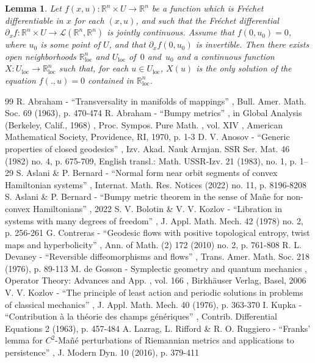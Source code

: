 \documentclass[11pt]{article}
\newcommand{\loc}{\mathrm{loc}}
\newcommand{\Rm}{\mathbb{R}}
\newcommand{\mL}{\ensuremath{\mathcal{L}}}
\theoremstyle{plain}
\newtheorem{lem}{Lemma}
\theoremstyle{definition}
\begin{document}
\begin{lem}
Let $f(x,u):\Rm^n\times U\to \Rm^n$ be a function which is Fréchet differentiable in $x$ for each $(x,u)$, and such that
the Fréchet differential $\partial_xf:\Rm^n\times U\to \mL(\Rm^n,\Rm^n)$ is jointly continuous. Assume that $f(0,u_0)=0$, where $u_0$ is some point of $U$, and that $\partial_x f(0,u_0)$ is invertible. Then there exists open neighborhoods $\Rm^n_{\loc}$ and $U_{\loc}$ of~$0$ and~$u_0$ and a continuous function $X: U_{\loc}\to \Rm^n_{\loc}$ such that, for each $u\in U_{\loc}$,
$X(u)$ is the only solution of the equation $f(.,u)=0$ contained in $\Rm^n_{\loc}$.
\end{lem}



\begin{thebibliography}{99}
 R. Abraham - “Transversality in manifolds of mappings” , Bull. Amer. Math. Soc. 69 (1963), p. 470-474
 R. Abraham - “Bumpy metrics” , in Global Analysis (Berkeley, Calif., 1968) , Proc. Sympos. Pure Math. , vol. XIV , American Mathematical Society, Providence, RI, 1970, p. 1-3
 D. V. Anosov - “Generic properties of closed geodesics” , Izv. Akad. Nauk Armjan. SSR Ser. Mat. 46 (1982) no. 4, p. 675-709, English transl.: Math. USSR-Izv. 21 (1983), no. 1, p. 1–29
 S. Aslani \& P. Bernard - “Normal form near orbit segments of convex Hamiltonian systems” , Internat. Math. Res. Notices (2022) no. 11, p. 8196-8208
 S. Aslani \& P. Bernard - “Bumpy metric theorem in the sense of Mañe for non-convex Hamiltonians” , 2022
 S. V. Bolotin \& V. V. Kozlov - “Libration in systems with many degrees of freedom” , J. Appl. Math. Mech. 42 (1978) no. 2, p. 256-261
 G. Contreras - “Geodesic flows with positive topological entropy, twist maps and hyperbolicity” , Ann. of Math. (2) 172 (2010) no. 2, p. 761-808
 R. L. Devaney - “Reversible diffeomorphisms and flows” , Trans. Amer. Math. Soc. 218 (1976), p. 89-113
 M. de Gosson - Symplectic geometry and quantum mechanics , Operator Theory: Advances and App. , vol. 166 , Birkhäuser Verlag, Basel, 2006
 V. V. Kozlov - “The principle of least action and periodic solutions in problems of classical mechanics” , J. Appl. Math. Mech. 40 (1976), p. 363-370
 I. Kupka - “Contribution à la théorie des champs génériques” , Contrib. Differential Equations 2 (1963), p. 457-484
 A. Lazrag, L. Rifford \& R. O. Ruggiero - “Franks’ lemma for $C^2$-Mañé perturbations of Riemannian metrics and applications to persistence” , J. Modern Dyn. 10 (2016), p. 379-411

\end{thebibliography}
\end{document}
